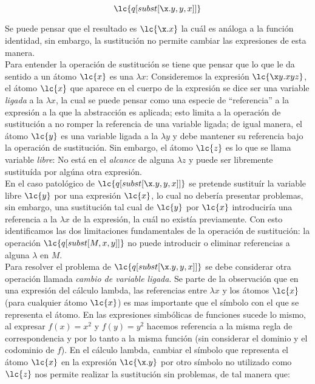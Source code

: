 \[\lc{q[subst[\x.y,y,x]]}\]

Se puede pensar que el resultado es \(\lc{\x.x}\) la cuál es análoga a la
función identidad, sin embargo, la sustitución no permite cambiar las
expresiones de esta manera. \\

Para entender la operación de sustitución se tiene que pensar que lo que le da
sentido a un átomo \(\lc{x}\) es una \(\lambda x\): Consideremos la expresión
\(\lc{\x y.x y z}\), el átomo \(\lc{x}\) que aparece en el cuerpo de la
expresión se dice ser una variable \emph{ligada} a la \(\lambda x\), la cual se
puede pensar como una especie de ``referencia'' a la expresión a la que la
abstracción es aplicada; esto limita a la operación de sustitución a no romper
la referencia de una variable ligada; de igual manera, el átomo \(\lc{y}\) es
una variable ligada a la \(\lambda y\) y debe mantener su referencia bajo la
operación de sustitución. Sin embargo, el átomo \(\lc{z}\) es lo que se llama
variable \emph{libre}: No está en el \emph{alcance} de alguna
\(\lambda z\) y puede ser libremente sustituída por algúna otra expresión. \\

En el caso patológico de \(\lc{q[subst[\x.y,y,x]]}\) se pretende sustituír la
variable libre \(\lc{y}\) por una expresión \(\lc{x}\), lo cual no debería
presentar problemas, sin embargo, una sustitución tal cual de \(\lc{y}\) por
\(\lc{x}\) introduciría una referencia a la \(\lambda x\) de la expresión, la
cuál no existía previamente. Con esto identificamos las dos limitaciones
fundamentales de la operación de sustitución: la operación
\(\lc{q[subst[M,x,y]]}\) no puede introducir o eliminar referencias a alguna
\(\lambda\) en \(M\). \\

Para resolver el problema de \(\lc{q[subst[\x.y,y,x]]}\) se debe considerar otra
operación llamada \emph{cambio de variable ligada}. Se parte de la observación
que en una expresión del cálculo lambda, las referencias entre \(\lambda x\) y
los átomos \(\lc{x}\) (para cualquier átomo \(\lc{x}\)) es mas importante que el
símbolo con el que se representa el átomo. En las expresiones simbólicas de
funciones sucede lo mismo, al expresar \(f(x)=x^{2}\) y \(f(y)=y^{2}\) hacemos
referencia a la misma regla de correspondencia y por lo tanto a la misma función
(sin considerar el dominio y el codominio de \(f\)). En el cálculo lambda,
cambiar el símbolo que representa el átomo \(\lc{x}\) en la expresión
\(\lc{\x.y}\) por otro símbolo no utilizado como \(\lc{z}\) nos permite realizar
la sustitución sin problemas, de tal manera que:

